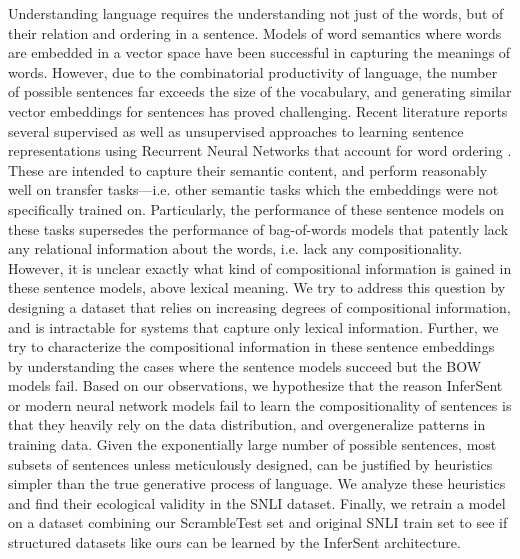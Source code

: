 \documentclass[10pt,letterpaper]{article}
\begin{document}
Understanding language requires the understanding not just of the words, but of their relation and ordering in a sentence. Models of word semantics where words are embedded in a vector space have been successful in capturing the meanings of words. However, due to the combinatorial productivity of language, the number of possible sentences far exceeds the size of the vocabulary, and generating similar vector embeddings for sentences has proved challenging. Recent literature reports several supervised as well as unsupervised approaches to learning sentence representations using Recurrent Neural Networks that account for word ordering \citep{Kiros:2015uq, Hill:2016uu, Conneau:2017uf}. 
These are intended to capture their semantic content, and perform reasonably well on transfer tasks---i.e. other semantic tasks which the embeddings were not specifically trained on. Particularly, the performance of these sentence models on these tasks supersedes the performance of bag-of-words models that patently lack any relational information about the words, i.e. lack any compositionality. However, it is unclear exactly what kind of compositional information is gained in these sentence models, above lexical meaning. We try to address this question by designing a dataset that relies on increasing degrees of compositional information, and is intractable for systems that capture only lexical information. Further, we try to characterize the compositional information in these sentence embeddings by understanding the cases where the sentence models succeed but the BOW models fail. Based on our observations, we hypothesize that the reason InferSent or modern neural network models fail to learn the compositionality of sentences is that they heavily rely on the data distribution, and overgeneralize patterns in training data. Given the exponentially large number of possible sentences, most subsets of sentences unless meticulously designed, can be justified by heuristics simpler than the true generative process of language. We analyze these heuristics and find their ecological validity in the SNLI dataset.  Finally, we retrain a model on a dataset combining our ScrambleTest set and original SNLI train set to see if structured datasets like ours can be learned by the InferSent architecture.
\end{document}
